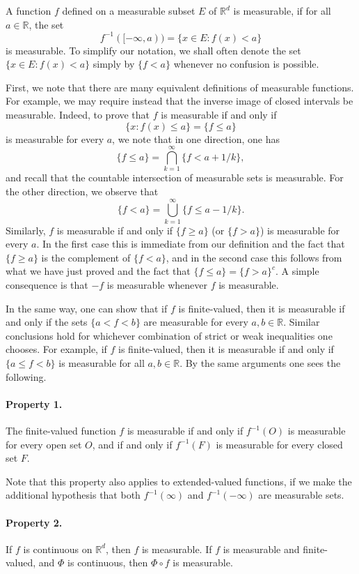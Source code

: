 \documentclass[11pt,openany]{book}
\begin{document}
A function $f$ defined on a measurable subset $E$ of $\mathbb{R}^d$ is measurable, if for all $a\in\mathbb{R}$, the set
\[
 f^{-1}([ -\infty,a))=\{x\in E:f(x)<a\}
\]
is measurable. To simplify our notation, we shall often denote the set $\{x\in E:f(x)<a\}$ simply by $\{f<a\}$ whenever no confusion is possible.

First, we note that there are many equivalent definitions of measurable functions. For example, we may require instead that the inverse image of closed intervals be measurable. Indeed, to prove that $f$ is measurable if and only if
\[
 \{x:f(x)\le a\}=\{f\le a\}
\]
is measurable for every $a$, we note that in one direction, one has
\[
 \{f\le a\}=\bigcap_{k=1}^{\infty}\{f<a+1/k\},
\]
and recall that the countable intersection of measurable sets is measurable. For the other direction, we observe that
\[
 \{f<a\}=\bigcup_{k=1}^{\infty}\{f\le a-1/k\}.
\]
Similarly, $f$ is measurable if and only if $\{f\ge a\}$ (or $\{f>a\}$) is measurable for every $a$. In the first case this is immediate from our definition and the fact that $\{f\ge a\}$ is the complement of $\{f<a\}$, and in the second case this follows from what we have just proved and the fact that $\{f\le a\}=\{f>a\}^c$. A simple consequence is that $-f$ is measurable whenever $f$ is measurable.

In the same way, one can show that if $f$ is finite-valued, then it is measurable if and only if the sets $\{a<f<b\}$ are measurable for every $a,b\in\mathbb{R}$. Similar conclusions hold for whichever combination of strict or weak inequalities one chooses. For example, if $f$ is finite-valued, then it is measurable if and only if $\{a\le f<b\}$ is measurable for all $a,b\in\mathbb{R}$. By the same arguments one sees the following.

\paragraph{Property 1.} The finite-valued function $f$ is measurable if and only if $f^{-1}(O)$ is measurable for every open set $O$, and if and only if $f^{-1}(F)$ is measurable for every closed set $F$.

Note that this property also applies to extended-valued functions, if we make the additional hypothesis that both $f^{-1}(\infty)$ and $f^{-1}(-\infty)$ are measurable sets.

\paragraph{Property 2.} If $f$ is continuous on $\mathbb{R}^d$, then $f$ is measurable. If $f$ is measurable and finite-valued, and $\Phi$ is continuous, then $\Phi\circ f$ is measurable.
\end{document}
